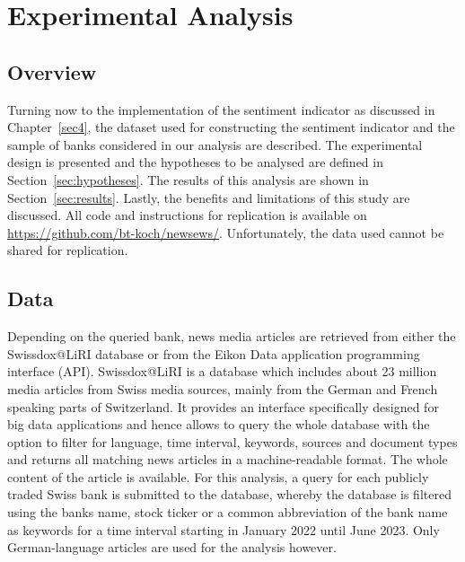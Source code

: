 \chapter{Experimental Analysis}\label{sec5}
\thispagestyle{empty}

\section{Overview}

Turning now to the implementation of the sentiment indicator as discussed in \mbox{Chapter~\ref{sec4}}, the dataset used for constructing the sentiment indicator and the sample of banks considered in our analysis are described. The experimental design is presented and the hypotheses to be analysed are defined in \mbox{Section~\ref{sec:hypotheses}}. The results of this analysis are shown in \mbox{Section~\ref{sec:results}}. Lastly, the benefits and limitations of this study are discussed. All code and instructions for replication is available on \url{https://github.com/bt-koch/newsews/}. Unfortunately, the data used cannot be shared for replication.

\section{Data}

Depending on the queried bank, news media articles are retrieved from either the Swissdox@LiRI database or from the Eikon Data application programming interface (API). Swissdox@LiRI is a database which includes about 23 million media articles from Swiss media sources, mainly from the German and French speaking parts of Switzerland. It provides an interface specifically designed for big data applications and hence allows to query the whole database with the option to filter for language, time interval, keywords, sources and document types and returns all matching news articles in a machine-readable format. The whole content of the article is available. For this analysis, a query for each publicly traded Swiss bank is submitted to the database, whereby the database is filtered using the banks name, stock ticker or a common abbreviation of the bank name as keywords for a time interval starting in January 2022 until June 2023. Only German-language articles are used for the analysis however. \\

